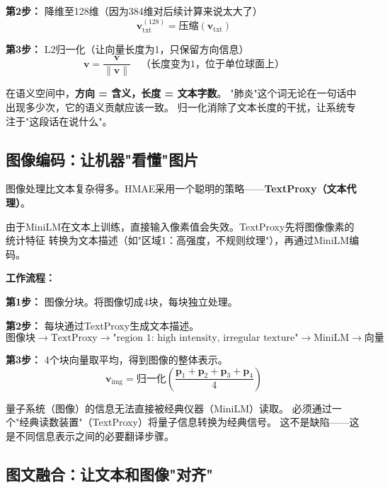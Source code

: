 \documentclass[11pt,a4paper]{ctexart}
\begin{document}
\textbf{第2步：} 降维至128维（因为384维对后续计算来说太大了）
$$\mathbf{v}_{\text{txt}}^{(128)} = \text{压缩}(\mathbf{v}_{\text{txt}})$$

\textbf{第3步：} L2归一化（让向量长度为1，只保留方向信息）
$$\mathbf{v} = \frac{\mathbf{v}}{\|\mathbf{v}\|} \quad \text{（长度变为1，位于单位球面上）}$$

\begin{keybox}[为什么只保留方向？]
在语义空间中，\textbf{方向 = 含义，长度 = 文本字数}。
"肺炎"这个词无论在一句话中出现多少次，它的语义贡献应该一致。
归一化消除了文本长度的干扰，让系统专注于"这段话在说什么"。
\end{keybox}

\subsection{图像编码：让机器"看懂"图片}

图像处理比文本复杂得多。HMAE采用一个聪明的策略——\textbf{TextProxy（文本代理）}。

\begin{defbox}
由于MiniLM在文本上训练，直接输入像素值会失效。TextProxy先将图像像素的统计特征
转换为文本描述（如"区域1：高强度，不规则纹理"），再通过MiniLM编码。
\end{defbox}

\textbf{工作流程：}

\textbf{第1步：} 图像分块。将图像切成4块，每块独立处理。

\textbf{第2步：} 每块通过TextProxy生成文本描述。
$$\text{图像块} \rightarrow \text{TextProxy} \rightarrow \text{"region 1: high intensity, irregular texture"} \rightarrow \text{MiniLM} \rightarrow \text{向量}$$

\textbf{第3步：} 4个块向量取平均，得到图像的整体表示。
$$\mathbf{v}_{\text{img}} = \text{归一化}\left(\frac{\mathbf{p}_1 + \mathbf{p}_2 + \mathbf{p}_3 + \mathbf{p}_4}{4}\right)$$

\begin{exambox}
量子系统（图像）的信息无法直接被经典仪器（MiniLM）读取。
必须通过一个"经典读数装置"（TextProxy）将量子信息转换为经典信号。
这不是缺陷——这是不同信息表示之间的必要翻译步骤。
\end{exambox}

\subsection{图文融合：让文本和图像"对齐"}
\end{document}
